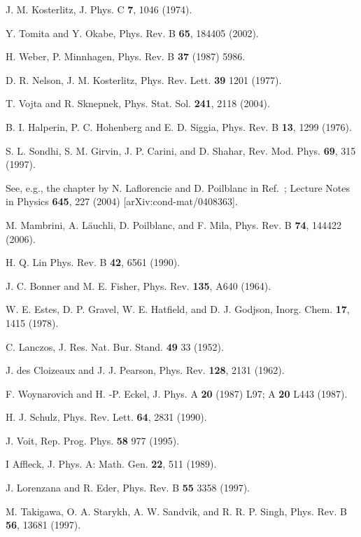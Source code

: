 \documentclass[draft,numberedheadings]{aipproc}
\begin{document}
\begin{thebibliography}{999}
J. M. Kosterlitz, J. Phys. C {\bf 7}, 1046 (1974).

Y. Tomita and Y. Okabe, Phys. Rev. B {\bf 65}, 184405 (2002).

H. Weber, P. Minnhagen, Phys. Rev. B {\bf 37} (1987) 5986. 

D. R. Nelson, J. M. Kosterlitz, Phys. Rev. Lett. {\bf 39} 1201 (1977). 

T. Vojta and R. Sknepnek, Phys. Stat. Sol. {\bf 241}, 2118 (2004).

B. I. Halperin, P. C. Hohenberg and E. D. Siggia, Phys. Rev. B {\bf 13}, 1299 (1976).

S. L. Sondhi, S. M. Girvin, J. P. Carini, and D. Shahar, Rev. Mod. Phys. {\bf 69}, 315 (1997). 

See, e.g., the chapter by N. Laflorencie and D. Poilblanc in Ref.~\cite{schollwock1};
Lecture Notes  in Physics {\bf 645}, 227 (2004) [arXiv:cond-mat/0408363].

M. Mambrini, A. L\"auchli, D. Poilblanc, and F. Mila, Phys. Rev. B {\bf 74}, 144422 (2006).

H. Q. Lin Phys. Rev. B {\bf 42}, 6561 (1990). 

J. C. Bonner and M. E. Fisher, Phys. Rev. {\bf 135}, A640 (1964).

W. E. Estes, D. P. Gravel, W. E. Hatfield, and D. J. Godjson, Inorg. Chem. {\bf 17}, 1415 (1978).

C. Lanczos, J. Res. Nat. Bur. Stand. {\bf 49} 33 (1952).

J. des Cloizeaux and J. J. Pearson, Phys. Rev. {\bf 128}, 2131 (1962). 

F. Woynarovich and H. -P. Eckel, J. Phys. A {\bf 20} (1987) L97; A {\bf 20} L443 (1987).

H. J. Schulz, Phys. Rev. Lett. {\bf 64}, 2831 (1990).

J. Voit, Rep. Prog. Phys. {\bf 58} 977 (1995).

I Affleck, J. Phys. A: Math. Gen. {\bf 22}, 511 (1989).
	
J. Lorenzana and R. Eder, Phys. Rev. B {\bf 55} 3358 (1997).

M. Takigawa, O. A. Starykh, A. W. Sandvik, and R. R. P. Singh,
Phys. Rev. B {\bf 56}, 13681 (1997).


\end{thebibliography}
\end{document}
